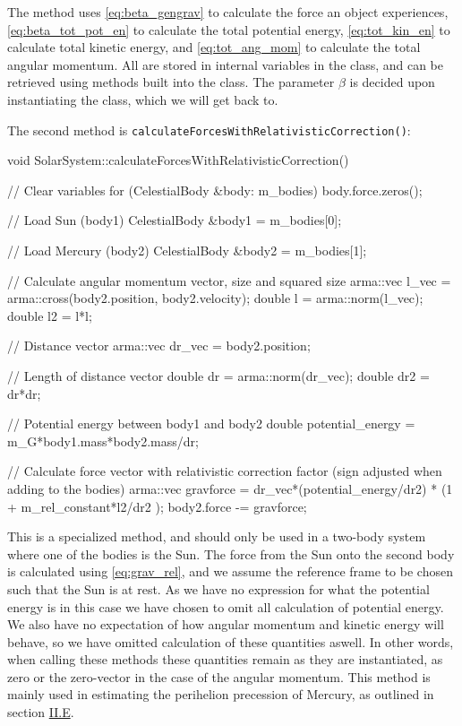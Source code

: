 \documentclass[reprint,english,notitlepage]{revtex4-1}  %
\begin{document}
The method uses \eqref{eq:beta_gengrav} to calculate the force an object experiences, \eqref{eq:beta_tot_pot_en} to calculate the total potential energy, \eqref{eq:tot_kin_en} to calculate total kinetic energy, and \eqref{eq:tot_ang_mom} to calculate the total angular momentum. All are stored in internal variables in the class, and can be retrieved using methods built into the class. The parameter $\beta$ is decided upon instantiating the class, which we will get back to. 

The second method is \verb+calculateForcesWithRelativisticCorrection()+:

\onecolumngrid
\begin{cpp}
void SolarSystem::calculateForcesWithRelativisticCorrection() {
  // Clear variables
  for (CelestialBody &body: m_bodies) {
    body.force.zeros();
  }

  // Load Sun (body1)
  CelestialBody &body1 = m_bodies[0];

  // Load Mercury (body2)
  CelestialBody &body2 = m_bodies[1];

  // Calculate angular momentum vector, size and squared size
  arma::vec l_vec = arma::cross(body2.position, body2.velocity);
  double l = arma::norm(l_vec);
  double l2 = l*l;


  // Distance vector
  arma::vec dr_vec = body2.position;

  // Length of distance vector
  double dr = arma::norm(dr_vec);
  double dr2 = dr*dr;

  // Potential energy between body1 and body2
  double potential_energy = m_G*body1.mass*body2.mass/dr;

  // Calculate force vector with relativistic correction factor (sign adjusted when adding to the bodies)
  arma::vec gravforce = dr_vec*(potential_energy/dr2) * (1 + m_rel_constant*l2/dr2 );
  body2.force -= gravforce;
}
\end{cpp}
\twocolumngrid

This is a specialized method, and should only be used in a two-body system where one of the bodies is the Sun. The force from the Sun onto the second body is calculated using \eqref{eq:grav_rel}, and we assume the reference frame to be chosen such that the Sun is at rest. As we have no expression for what the potential energy is in this case we have chosen to omit all calculation of potential energy. We also have no expectation of how angular momentum and kinetic energy will behave, so we have omitted calculation of these quantities aswell. In other words, when calling these methods these quantities remain as they are instantiated, as zero or the zero-vector in the case of the angular momentum. This method is mainly used in estimating the perihelion precession of Mercury, as outlined in section \hyperref[sec:II:e]{II.E}.
\end{document}
